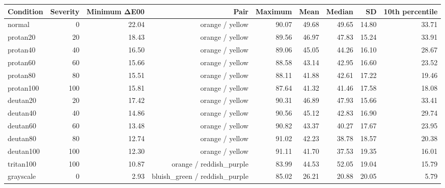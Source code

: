 \begin{tabular}{lrrrrrrrr}
\toprule
Condition & Severity & Minimum ΔE00 & Pair & Maximum & Mean & Median & SD & 10th percentile \\
\midrule
normal & 0 & 22.04 & orange / yellow & 90.07 & 49.68 & 49.65 & 14.80 & 33.71 \\
protan20 & 20 & 18.43 & orange / yellow & 89.56 & 46.97 & 47.83 & 15.24 & 33.91 \\
protan40 & 40 & 16.50 & orange / yellow & 89.06 & 45.05 & 44.26 & 16.10 & 28.67 \\
protan60 & 60 & 15.66 & orange / yellow & 88.58 & 43.14 & 42.95 & 16.60 & 23.52 \\
protan80 & 80 & 15.51 & orange / yellow & 88.11 & 41.88 & 42.61 & 17.22 & 19.46 \\
protan100 & 100 & 15.81 & orange / yellow & 87.64 & 41.32 & 41.46 & 17.58 & 18.08 \\
deutan20 & 20 & 17.42 & orange / yellow & 90.31 & 46.89 & 47.93 & 15.66 & 33.41 \\
deutan40 & 40 & 14.86 & orange / yellow & 90.56 & 45.12 & 42.83 & 16.90 & 29.74 \\
deutan60 & 60 & 13.48 & orange / yellow & 90.82 & 43.37 & 40.27 & 17.67 & 23.95 \\
deutan80 & 80 & 12.74 & orange / yellow & 91.02 & 42.23 & 38.78 & 18.57 & 20.38 \\
deutan100 & 100 & 12.30 & orange / yellow & 91.11 & 41.70 & 37.53 & 19.35 & 16.01 \\
tritan100 & 100 & 10.87 & orange / reddish\_purple & 83.99 & 44.53 & 52.05 & 19.04 & 15.79 \\
grayscale & 0 & 2.93 & bluish\_green / reddish\_purple & 85.02 & 26.21 & 20.88 & 20.05 & 5.79 \\
\bottomrule
\end{tabular}
